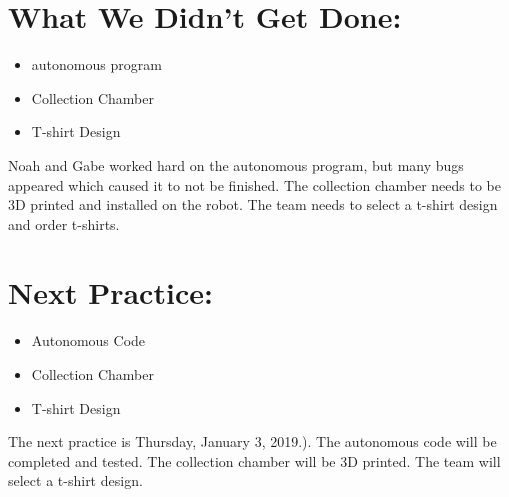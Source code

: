 \documentclass[12pt]{article}
\begin{document}
\section{What We Didn't Get Done:} %
\begin{itemize}
	 \item autonomous program

	\item Collection Chamber

	\item T-shirt Design
	
  \end{itemize}



            Noah and Gabe worked hard on the autonomous program, but many bugs appeared which caused it to not be finished.  The collection chamber needs to be 3D printed and installed on the robot. The team needs to select a t-shirt design and order t-shirts.
\section{Next Practice:}
\begin{itemize}
	 \item Autonomous Code

	\item Collection Chamber

	\item T-shirt Design                      
\end{itemize}

The next practice is Thursday, January 3, 2019.). The autonomous code will be completed and tested. The collection chamber will be 3D printed. The team will select a t-shirt design.
\end{document}
